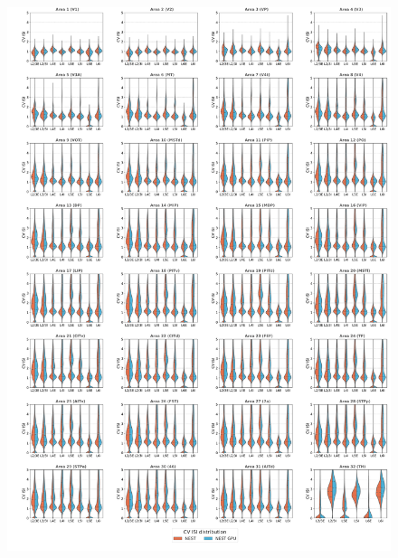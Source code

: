 \documentclass[a4paper, 12pt, twoside, openright]{book}
\begin{document}
\begin{figure}[H]
    \centering
    \includegraphics[width=\columnwidth]{figures/dist_violinplot_vert_ms_CV_ISI.pdf}
\end{figure}
\end{document}
